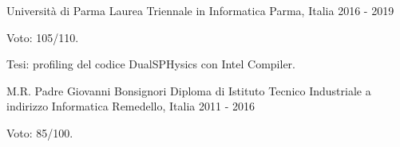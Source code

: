 \begin{cventries}
  \cventry
    {Università di Parma} %
    {Laurea Triennale in Informatica} %
    {Parma, Italia} %
    {2016 - 2019} %
    {
      \begin{cvitems} %
        \item {Voto: 105/110.}
        \item {Tesi: profiling del codice DualSPHysics con Intel Compiler.}
      \end{cvitems}
    }

  \cventry
    {M.R. Padre Giovanni Bonsignori} %
    {Diploma di Istituto Tecnico Industriale a indirizzo Informatica} %
    {Remedello, Italia} %
    {2011 - 2016} %
    {
      \begin{cvitems} %
        \item {Voto: 85/100.}
      \end{cvitems}
    }

\end{cventries}
